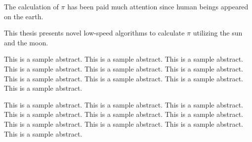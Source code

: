 The calculation of $\pi$ has been paid much attention since human beings appeared on the earth.

This thesis presents novel low-speed algorithms to calculate $\pi$ utilizing the sun and the moon.

This is a sample abstract. This is a sample abstract. This is a sample abstract. This is a sample abstract. This is a sample abstract. This is a sample abstract. This is a sample abstract. This is a sample abstract. This is a sample abstract. This is a sample abstract.

This is a sample abstract. This is a sample abstract. This is a sample abstract. This is a sample abstract. This is a sample abstract. This is a sample abstract. This is a sample abstract. This is a sample abstract. This is a sample abstract. This is a sample abstract.